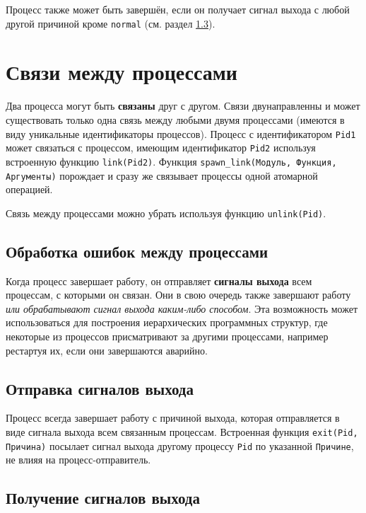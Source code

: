 Процесс также может быть завершён, если он получает сигнал выхода с любой другой
причиной кроме \texttt{normal} (см. раздел \ref{processes:recvexitsignals}).


\section{Связи между процессами}
\label{processes:links}

Два процесса могут быть \textbf{связаны} друг с другом. Связи двунаправленны и
может существовать только одна связь между любыми двумя процессами (имеются в виду 
уникальные идентификаторы процессов). Процесс с идентификатором \texttt{Pid1} может
связаться с процессом, имеющим идентификатор \texttt{Pid2} используя встроенную
функцию \texttt{link(Pid2)}.  Функция \texttt{spawn\_link(Модуль, Функция, 
Аргументы)} порождает и сразу же связывает процессы одной атомарной операцией.

Связь между процессами можно убрать используя функцию \texttt{unlink(Pid)}.


\subsection{Обработка ошибок между процессами}

Когда процесс завершает работу, он отправляет \textbf{сигналы выхода} всем 
процессам, с которыми он связан.  Они в свою очередь также завершают работу 
\emph{или обрабатывают сигнал выхода каким-либо способом}. Эта возможность может 
использоваться для построения иерархических программных структур, где некоторые из
процессов присматривают за другими процессами, например рестартуя их, если они
завершаются аварийно.


\subsection{Отправка сигналов выхода}
\label{processes:sendexitsignals}

Процесс всегда завершает работу с причиной выхода, которая отправляется в виде
сигнала выхода всем связанным процессам. Встроенная функция \texttt{exit(Pid, 
Причина)} посылает сигнал выхода другому процессу \texttt{Pid} по указанной
\texttt{Причине}, не влияя на процесс-отправитель.


\subsection{Получение сигналов выхода}
\label{processes:recvexitsignals}


